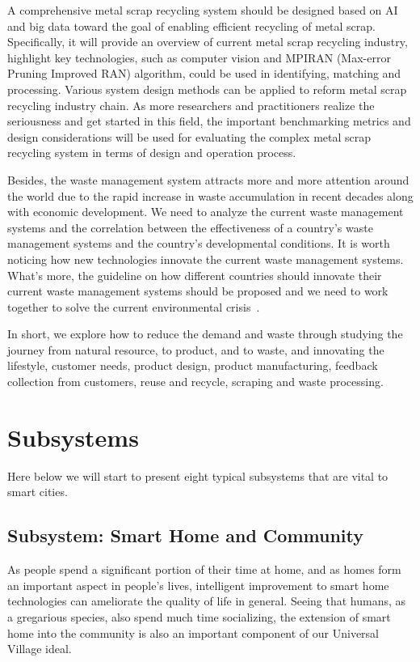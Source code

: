 \documentclass[letterpaper, twocolumn, 10pt, conference]{IEEEtran}
\begin{document}
A comprehensive metal scrap recycling system should be designed based on AI and big data toward the goal of enabling efficient recycling of metal scrap. Specifically, it will provide an overview of current metal scrap recycling industry, highlight key technologies, such as computer vision and MPIRAN (Max-error Pruning Improved RAN) algorithm, could be used in identifying, matching and processing. Various system design methods can be applied to reform metal scrap recycling industry chain. As more researchers and practitioners realize the seriousness and get started in this field, the important benchmarking metrics and design considerations will be used for evaluating the complex metal scrap recycling system in terms of design and operation process.

Besides, the waste management system attracts more and more attention around the world due to the rapid increase in waste accumulation in recent decades along with economic development. We need to analyze the current waste management systems and the correlation between the effectiveness of a country’s waste management systems and the country’s developmental conditions. It is worth noticing how new technologies innovate the current waste management systems. What’s more, the guideline on how different countries should innovate their current waste management systems should be proposed and we need to work together to solve the current environmental crisis~\cite{uv2018-wastemanagement-wen.shunzhi}.


In short, we  explore how to reduce the demand and waste through studying the journey from natural resource, to product, and to waste, and innovating the lifestyle, customer needs, product design, product manufacturing, feedback collection from customers, reuse and recycle, scraping and waste processing. 


\section{Subsystems}
\label{sec:Subsystems}

Here below we will start to present eight typical subsystems that are vital to smart cities.

\subsection{Subsystem: Smart Home and Community} 
\label{ssec:zcy:smart_home} %

As people spend a significant portion of their time at home, and as homes form an important aspect in people’s lives, intelligent improvement to smart home technologies can ameliorate the quality of life in general. Seeing that humans, as a gregarious species, also spend much time socializing, the extension of smart home into the community is also an important component of our Universal Village ideal.
\end{document}
